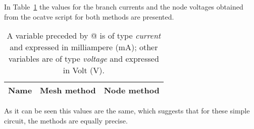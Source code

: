 In Table~\ref{tab:theoretical} the values for the branch currents and the node voltages obtained from the ocatve script for both methods are presented.\par 
\begin{table}[h]
  \centering
  \begin{tabular}{|l|r|r|}
    \hline    
    {\bf Name} & {\bf Mesh method} & {\bf Node method}\\ \hline
    
  \end{tabular}
  \caption{A variable preceded by @ is of type {\em current}
    and expressed in milliampere (mA); other variables are of type {\it voltage} and expressed in
    Volt (V).}
  \label{tab:theoretical}
\end{table}

As it can be seen this values are the same, which suggests that for these simple circuit, the methods are equally precise. 
